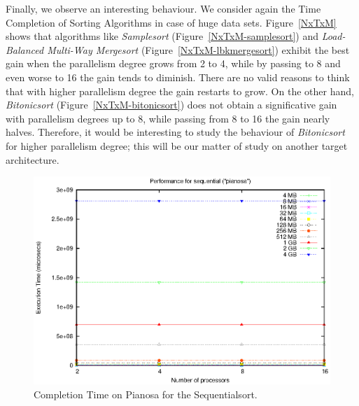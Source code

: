 Finally, we observe an interesting behaviour. We consider again the Time Completion of Sorting Algorithms in case of huge data sets. Figure~\ref{NxTxM} shows that algorithms like \textit{Samplesort} (Figure~\ref{NxTxM-samplesort}) and \textit{Load-Balanced Multi-Way Mergesort} (Figure~\ref{NxTxM-lbkmergesort}) exhibit the best gain when the parallelism degree grows from 2 to 4, while by passing to 8 and even worse to 16 the gain tends to diminish. There are no valid reasons to think that with higher parallelism degree the gain restarts to grow. On the other hand, \textit{Bitonicsort} (Figure~\ref{NxTxM-bitonicsort}) does not obtain a significative gain with parallelism degrees up to 8, while passing from 8 to 16 the gain nearly halves. Therefore, it would be interesting to study the behaviour of \textit{Bitonicsort} for higher parallelism degree; this will be our matter of study on another target architecture.

\begin{figure}[t]
	\begin{center}
		\includegraphics[scale=0.6]{plots/test_01_pianosa/NxTxM/sequential_pianosa_NxTxM}
	\end{center}
  	\caption{Completion Time on Pianosa for the Sequentialsort.}
  	\label{sequential-pianosa}
\end{figure}

